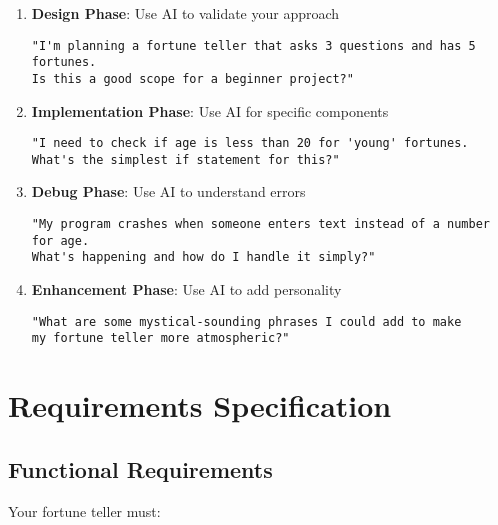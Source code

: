 \documentclass[
  letterpaper,
  DIV=11,
  numbers=noendperiod,
  oneside]{scrreprt}
\begin{document}
\begin{enumerate}
\def\labelenumi{\arabic{enumi}.}
\item
  \textbf{Design Phase}: Use AI to validate your approach

\begin{verbatim}
"I'm planning a fortune teller that asks 3 questions and has 5 fortunes. 
Is this a good scope for a beginner project?"
\end{verbatim}
\item
  \textbf{Implementation Phase}: Use AI for specific components

\begin{verbatim}
"I need to check if age is less than 20 for 'young' fortunes. 
What's the simplest if statement for this?"
\end{verbatim}
\item
  \textbf{Debug Phase}: Use AI to understand errors

\begin{verbatim}
"My program crashes when someone enters text instead of a number for age. 
What's happening and how do I handle it simply?"
\end{verbatim}
\item
  \textbf{Enhancement Phase}: Use AI to add personality

\begin{verbatim}
"What are some mystical-sounding phrases I could add to make 
my fortune teller more atmospheric?"
\end{verbatim}
\end{enumerate}

\section{Requirements Specification}\label{requirements-specification}

\subsection{Functional Requirements}\label{functional-requirements}

Your fortune teller must:
\end{document}
